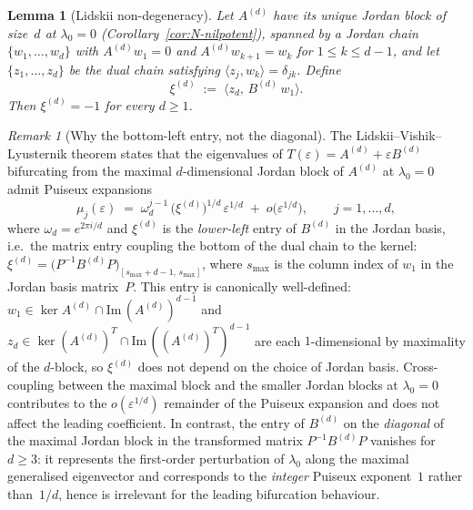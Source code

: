 \documentclass{amsart}
\newtheorem{lemma}[theorem]{Lemma}
\theoremstyle{definition}
\theoremstyle{remark}
\newtheorem{remark}[theorem]{Remark}
\begin{document}
\begin{lemma}[Lidskii non-degeneracy]
\label{lem:lidskii-nondeg}
Let $A^{(d)}$ have its unique Jordan block of size~$d$ at
$\lambda_0 = 0$ \textup{(}Corollary~\ref{cor:N-nilpotent}\textup{)},
spanned by a Jordan chain $\{w_1, \ldots, w_d\}$ with
$A^{(d)} w_1 = 0$ and $A^{(d)} w_{k+1} = w_k$ for
$1 \le k \le d-1$, and let $\{z_1, \ldots, z_d\}$ be the dual
chain satisfying $\langle z_j, w_k\rangle = \delta_{jk}$.  Define
\begin{equation}\label{eq:lidskii-coef}
  \xi^{(d)} \;:=\; \langle z_d,\, B^{(d)}\, w_1\rangle.
\end{equation}
Then $\xi^{(d)} = -1$ for every $d \ge 1$.
\end{lemma}

\begin{remark}[Why the bottom-left entry, not the diagonal]
\label{rem:lidskii-bottom-left}
The Lidskii--Vishik--Lyusternik theorem
\cite{moro-burke-overton-1997} states that the eigenvalues of
$T(\varepsilon) = A^{(d)} + \varepsilon B^{(d)}$ bifurcating from
the maximal $d$-dimensional Jordan block of $A^{(d)}$ at
$\lambda_0 = 0$ admit Puiseux expansions
\[
  \mu_j(\varepsilon) \;=\; \omega_d^{j-1}\,
    \bigl(\xi^{(d)}\bigr)^{1/d}\, \varepsilon^{1/d}
    \;+\; o\bigl(\varepsilon^{1/d}\bigr),
  \qquad j = 1, \ldots, d,
\]
where $\omega_d = e^{2\pi i/d}$ and $\xi^{(d)}$ is the
\emph{lower-left} entry of $B^{(d)}$ in the Jordan basis,
i.e.\ the matrix entry coupling the bottom of the dual chain to
the kernel: $\xi^{(d)} = \bigl(P^{-1} B^{(d)} P\bigr)_{[s_{\max} +
d - 1,\, s_{\max}]}$, where $s_{\max}$ is the column index of
$w_1$ in the Jordan basis matrix~$P$.  This entry is canonically
well-defined: $w_1 \in \ker A^{(d)} \cap \mathrm{Im}\,(A^{(d)})^{d-1}$
and $z_d \in \ker (A^{(d)})^T \cap \mathrm{Im}\,((A^{(d)})^T)^{d-1}$
are each $1$-dimensional by maximality of the
$d$-block, so $\xi^{(d)}$ does not depend on the choice of
Jordan basis.  Cross-coupling between the maximal block and the
smaller Jordan blocks at $\lambda_0 = 0$ contributes to the
$o(\varepsilon^{1/d})$ remainder of the Puiseux expansion and
does not affect the leading coefficient.  In contrast, the entry
of $B^{(d)}$ on the \emph{diagonal} of the maximal Jordan block
in the transformed matrix $P^{-1} B^{(d)} P$ vanishes for
$d \ge 3$: it represents the first-order perturbation of
$\lambda_0$ along the maximal generalised eigenvector and
corresponds to the \emph{integer} Puiseux exponent~$1$ rather
than~$1/d$, hence is irrelevant for the leading bifurcation
behaviour.
\end{remark}
\end{document}
